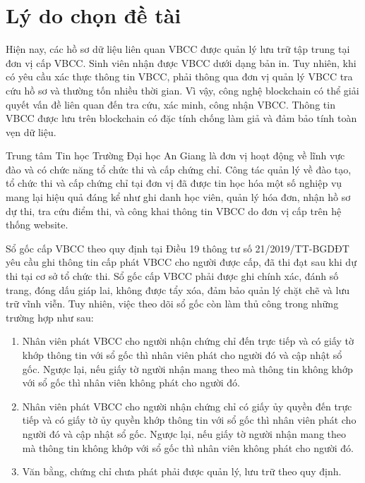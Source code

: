 \section{Lý do chọn đề tài}

Hiện nay, các hồ sơ dữ liệu liên quan VBCC được quản lý lưu trữ tập trung tại đơn vị cấp VBCC.
Sinh viên nhận được VBCC dưới dạng bản in.
Tuy nhiên, khi có yêu cầu xác thực thông tin VBCC, phải thông qua đơn vị quản lý VBCC tra cứu hồ sơ và thường tốn nhiều thời gian.
Vì vậy, công nghệ blockchain có thể giải quyết vấn đề liên quan đến tra cứu, xác minh, công nhận VBCC.
Thông tin VBCC được lưu trên blockchain có đặc tính chống làm giả và đảm bảo tính toàn vẹn dữ liệu.  

Trung tâm Tin học Trường Đại học An Giang là đơn vị hoạt động về lĩnh vực đào và có chức năng tổ chức thi và cấp chứng chỉ.
Công tác quản lý về đào tạo, tổ chức thi và cấp chứng chỉ tại đơn vị đã được tin học hóa một số nghiệp vụ mang lại hiệu quả đáng kể như ghi danh học viên, quản lý hóa đơn, nhận hồ sơ dự thi, tra cứu điểm thi, và công khai thông tin VBCC do đơn vị cấp trên hệ thống website.

Sổ gốc cấp VBCC theo quy định tại Điều 19 thông tư số 21/2019/TT-BGDĐT yêu cầu ghi thông tin cấp phát VBCC cho người được cấp, đã thi đạt sau khi dự thi tại cơ sở tổ chức thi.
Sổ gốc cấp VBCC phải được ghi chính xác, đánh số trang, đóng dấu giáp lai, không được tẩy xóa, đảm bảo quản lý chặt chẽ và lưu trữ vĩnh viễn.
Tuy nhiên, việc theo dõi sổ gốc còn làm thủ công trong những trường hợp như sau:

\begin{enumerate}
\item Nhân viên phát VBCC cho người nhận chứng chỉ đến trực tiếp và có giấy tờ khớp thông tin với sổ gốc thì nhân viên phát cho người đó và cập nhật sổ gốc. Ngược lại, nếu giấy tờ người nhận mang theo mà thông tin không khớp với sổ gốc thì nhân viên không phát cho người đó.

\item Nhân viên phát VBCC cho người nhận chứng chỉ có giấy ủy quyền đến trực tiếp và có giấy tờ ủy quyền khớp thông tin với sổ gốc thì nhân viên phát cho người đó và cập nhật sổ gốc. Ngược lại, nếu giấy tờ người nhận mang theo mà thông tin không khớp với sổ gốc thì nhân viên không phát cho người đó.

\item Văn bằng, chứng chỉ chưa phát phải được quản lý, lưu trữ theo quy định.
\end{enumerate}

